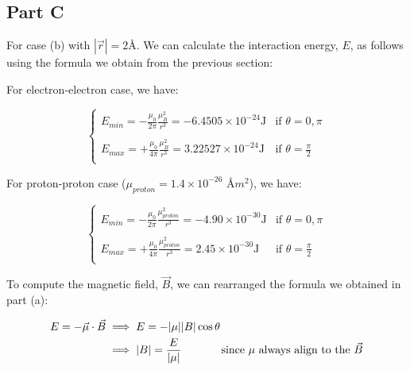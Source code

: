 \documentclass[11pt]{article}
\begin{document}
  \subsection{Part C}

  For case (b) with $|\vec{r}| = 2\text{\AA}$. We can calculate the interaction energy, $E$, as follows using the 
  formula we obtain from the previous section:

  For electron-electron case, we have:

  \begin{equation}
    \begin{cases}
      \displaystyle
      E_{min} = -\frac{\mu_0}{2\pi} \frac{\mu_B^2}{r^3} = - 6.4505 \times 10^{-24} \text{J} & \text{if } \theta = 0, \pi \\
      \\
      \displaystyle
      E_{max} = +\frac{\mu_0}{4\pi} \frac{\mu_B^2}{r^3} = 3.22527 \times 10^{-24} \text{J} & \text{if } \theta = \frac{\pi}{2}\\
    \end{cases}
  \end{equation}

  For proton-proton case ($\mu_{proton} = 1.4 \times 10^{-26}$ \AA$m^2$), we have:

  \begin{equation}
    \begin{cases}
      \displaystyle
      E_{min} = -\frac{\mu_0}{2\pi} \frac{\mu_{proton}^2}{r^3} = -4.90 \times 10^{-30} \text{J} & \text{if } \theta = 0, \pi \\
      \\
      \displaystyle
      E_{max} = +\frac{\mu_0}{4\pi} \frac{\mu_{proton}^2}{r^3} = 2.45 \times 10^{-30} \text{J} & \text{if } \theta = \frac{\pi}{2}\\
    \end{cases}
  \end{equation}

  To compute the magnetic field, $\vec{B}$, we can rearranged the formula we obtained in part (a):

  \begin{align*}
    E = - \vec{\mu} \cdot \vec{B} &\implies E  = - |\mu| |B| \cos{\theta} \\
    &\implies |B| = \frac{E}{|\mu|} \hspace{0.5in} \text{since $\mu$ always align to the $\vec{B}$} \\
  \end{align*}
\end{document}
